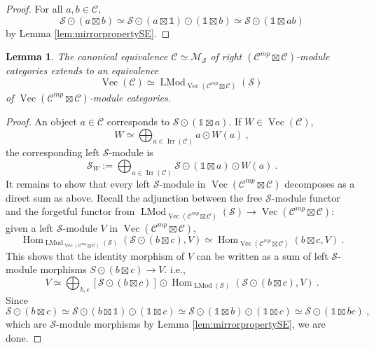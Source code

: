 \documentclass[a4paper,11pt,reqno]{amsart}
\numberwithin{equation}{section}
\newtheorem{lemma}[theorem]{Lemma}
\theoremstyle{remark}
\theoremstyle{definition}
\newcommand{\cC}{\mathcal C}
\newcommand{\cM}{\mathcal M}
\newcommand{\cS}{\mathcal S}
\newcommand{\mpcC}{\cC^{mp}}
\DeclareMathOperator{\Hom}{Hom}
\DeclareMathOperator{\Irr}{Irr}
\DeclareMathOperator{\Vect}{Vec}
\DeclareMathOperator{\LMod}{LMod}
\newcommand\un{{\mathds 1}}
\begin{document}
\begin{proof}
    For all $a,b \in \cC$,
    \[ \cS \odot (a \boxtimes b) \simeq \cS \odot (a \boxtimes \un) \odot (\un \boxtimes b) \simeq \cS \odot (\un \boxtimes ab) \]
    by Lemma \ref{lem:mirrorpropertySE}.
\end{proof}


\begin{lemma}
The canonical equivalence $\cC \simeq \cM_\cS$ of right $(\mpcC \boxtimes \cC)$-module categories extends to an equivalence 
\[ \Vect(\cC) \simeq \LMod_{\Vect(\cC^{mp} \boxtimes \cC)}(\cS) \  \]
of $\Vect(\mpcC \boxtimes \cC)$-module categories.
\end{lemma}

\begin{proof}
An object $a \in \cC$ corresponds to $\cS \odot (\un \boxtimes a)$. If $W \in \Vect(\cC)$, 
\[ W \simeq \bigoplus_{a \in \Irr(\cC)} a \odot W(a) \ , \]
the corresponding left $\cS$-module is
\[\cS_W := \bigoplus_{a \in \Irr(\cC)} \cS \odot (\un \boxtimes a) \odot W(a) \ . \]
It remains to show that every left $\cS$-module in $\Vect(\cC^{mp}\boxtimes\cC)$ decomposes as a direct sum as above. Recall the adjunction between the free $\cS$-module functor and the forgetful functor from $\LMod_{\Vect(\cC^{mp} \boxtimes \cC)}(\cS) \to \Vect(\cC^{mp}\boxtimes \cC)$: given a left $\cS$-module $V$ in $\Vect(\cC^{mp} \boxtimes \cC)$,
\[ \Hom_{\LMod_{\Vect(\cC^{mp} \boxtimes \cC)}(\cS)}(\cS \odot (b \boxtimes c), V) \simeq \Hom_{\Vect(\cC^{mp} \boxtimes \cC)}(b \boxtimes c, V) \ . \]
This shows that the identity morphism of $V$ can be written as a sum of left $\cS$-module morphisms $S \odot (b \boxtimes c) \to V$. i.e.,
\[ V \simeq \bigoplus_{b,c} \left[ \cS \odot (b \boxtimes c) \right] \odot \Hom_{\LMod(\cS)}(\cS \odot (b \boxtimes c), V) \ . \]
Since
\[ \cS \odot (b \boxtimes c) \simeq \cS \odot(b \boxtimes \un) \odot(\un \boxtimes c) \simeq \cS \odot (\un \boxtimes b) \odot (\un \boxtimes c) \simeq \cS \odot (\un \boxtimes bc) \ ,\]
which are $\cS$-module morphisms by Lemma \ref{lem:mirrorpropertySE}, we are done.
\end{proof}
\end{document}
